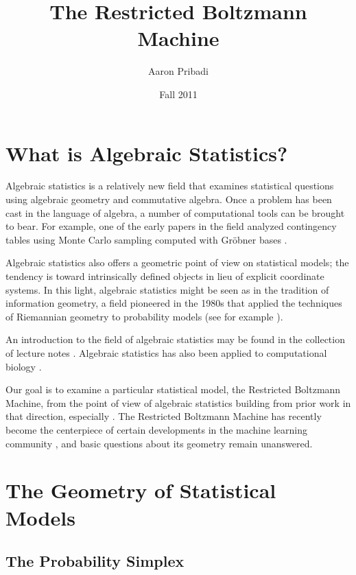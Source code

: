 \documentclass[11pt,titlepage]{article}
\title{The Restricted Boltzmann Machine}
\author{Aaron Pribadi}
\date{Fall 2011}
\numberwithin{equation}{section}
\begin{document}
\maketitle

\tableofcontents

\pagebreak

\section{What is Algebraic Statistics?}

    Algebraic statistics is a relatively new field that examines statistical
    questions using algebraic geometry and commutative algebra.  Once a problem
    has been cast in the language of algebra, a number of computational tools
    can be brought to bear.  For example, one of the early papers in the field
    analyzed contingency tables using Monte Carlo sampling computed with Gröbner
    bases \cite{DS98}.

    Algebraic statistics also offers a geometric point of view on statistical
    models; the tendency is toward intrinsically defined objects in lieu of
    explicit coordinate systems.  In this light, algebraic statistics might be
    seen as in the tradition of information geometry, a field pioneered in the
    1980s that applied the techniques of Riemannian geometry to probability
    models (see for example \cite{Ama}).

    An introduction to the field of algebraic statistics may be found in the
    collection of lecture notes \cite{DSS08}.  Algebraic statistics has also
    been applied to computational biology \cite{ASCB}.

    Our goal is to examine a particular statistical model, the Restricted
    Boltzmann Machine, from the point of view of algebraic statistics building
    from prior work in that direction, especially \cite{CMS09}.  The Restricted
    Boltzmann Machine has recently become the centerpiece of certain
    developments in the machine learning community \cite{Hin07}, and basic
    questions about its geometry remain unanswered.

\section{The Geometry of Statistical Models}
    \subsection{The Probability Simplex}
\end{document}
